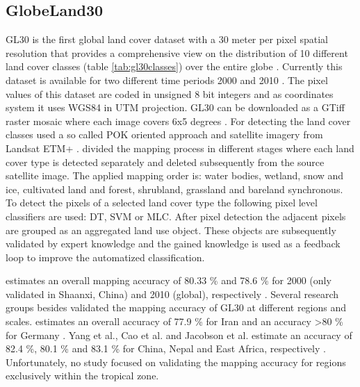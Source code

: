 	\subsection{GlobeLand30}
		\ac{GL30} is the first global land cover dataset with a 30 meter per pixel spatial resolution that provides a comprehensive view on the distribution of 10 different land cover classes (table \ref{tab:gl30classes}) over the entire globe \citep{Chen2017}. Currently this dataset is available for two different time periods 2000 and 2010 \citep{Chen2015}. The pixel values of this dataset are coded in unsigned 8 bit integers and as coordinates system it uses \ac{WGS84} in \ac{UTM} projection. \ac{GL30} can be downloaded as a \ac{GTiff} raster mosaic where each image covers 6x5 degrees \citep{Chen2014}. For detecting the land cover classes \citeauthor{Chen2015} used a so called \ac{POK} oriented approach and satellite imagery from Landsat \ac{ETM+} \citep{Chen2015}. \citeauthor{Chen2015} divided the mapping process in different stages where each land cover type is detected separately and deleted subsequently from the source satellite image. The applied mapping order is: water bodies, wetland, snow and ice, cultivated land and forest, shrubland, grassland and bareland synchronous. To detect the pixels of a selected land cover type the following pixel level classifiers are used: \ac{DT}, \ac{SVM} or \ac{MLC}. After pixel detection the adjacent pixels are grouped as an aggregated land use object. These objects are subsequently validated by expert knowledge and the gained knowledge is used as a feedback loop to improve the automatized classification.

		\citeauthor{Chen2015} estimates an overall mapping accuracy of 80.33 \% and 78.6 \% for 2000 (only validated in Shaanxi, China) and 2010 (global), respectively \citep{Chen2015}. Several research groups besides \citeauthor{Chen2015} validated the mapping accuracy of \ac{GL30} at different regions and scales. \citeauthor{Arsanjani2016} estimates an overall accuracy of 77.9 \% for Iran and an accuracy >80 \% for Germany \citep{Arsanjani2016a,Arsanjani2016}. Yang et al., Cao et al. and Jacobson et al. estimate an accuracy of 82.4 \%, 80.1 \% and 83.1 \% for China, Nepal and East Africa, respectively \citep{Yang2017,Cao2016,Jacobson2015}. Unfortunately, no study focused on validating the mapping accuracy for regions exclusively within the tropical zone.

